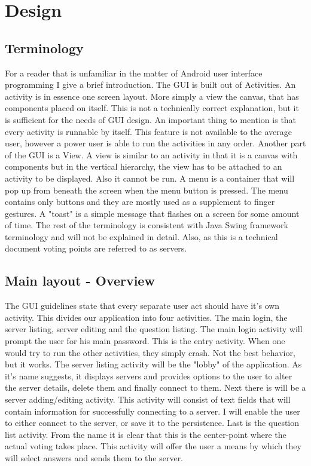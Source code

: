 \documentclass[11pt]{article} %
\begin{document}
\section{Design}
\subsection{Terminology}
For a reader that is unfamiliar in the matter of Android user interface programming I give a brief introduction. The GUI is built out of Activities. An activity is in essence one screen layout. More simply a view the canvas, that has components placed on itself. This is not a technically correct explanation, but it is sufficient for the needs of GUI design. An important thing to mention is that every activity is runnable by itself. This feature is not available to the average user, however a power user is able to run the activities in any order. Another part of the GUI is a View. A view is similar to an activity in that it is a canvas with components but in the vertical hierarchy, the view has to be attached to an activity to be displayed. Also it cannot be run. A menu is a container that will pop up from beneath the screen when the menu button is pressed. The menu contains only buttons and they are mostly used as a supplement to finger gestures. A "toast" is a simple message that flashes on a screen for some amount of time. The rest of the terminology is consistent with Java Swing framework terminology and will not be explained in detail. Also, as this is a technical document voting points are referred to as servers. 
\subsection{Main layout - Overview}
The GUI guidelines state that every separate user act should have it's own activity. This divides our application into four activities. The main login, the server listing, server editing and the question listing. The main login activity will prompt the user for his main password. This is the entry activity. When one would try to run the other activities, they simply crash. Not the best behavior, but it works. The server listing activity will be the "lobby" of the application. As it's name suggests, it displays servers and provides options to the user to alter the server details, delete them and finally connect to them. Next there is will be a server adding/editing activity. This activity will consist of text fields that will contain information for successfully connecting to a server. I will enable the user to either connect to the server, or save it to the persistence. Last is the question list activity. From the name it is clear that this is the center-point where the actual voting takes place. This activity will offer the user a means by which they will select answers and sends them to the server.
\end{document}
